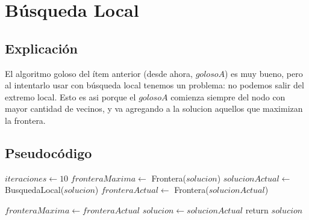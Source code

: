 \section{Búsqueda Local}

\subsection{Explicación}


El algoritmo goloso del ítem anterior (desde ahora, $goloso A$) es muy bueno, pero al intentarlo usar con búsqueda local tenemos un problema: no podemos salir del extremo local. Esto es asi porque el $goloso A$ comienza siempre del nodo con mayor cantidad de vecinos, y va agregando a la solucion aquellos que maximizan la frontera.


\subsection{Pseudocódigo}

\begin{algorithm}[H]
\begin{algorithmic}
    \State $iteraciones \gets 10$
    \State $fronteraMaxima \gets$ Frontera($solucion$)
        \State $solucionActual \gets$ BusquedaLocal($solucion$)
        \State $fronteraActual \gets$ Frontera($solucionActual$)

            \State $fronteraMaxima \gets fronteraActual$
            \State $solucion \gets solucionActual$
        \EndIf
    \EndFor
    \State return $solucion$

\EndFunction
\end{algorithmic}
\end{algorithm}


